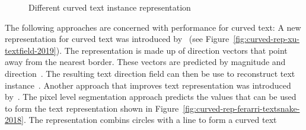 \begin{figure}[ht]
    \centering\scriptsize
    \caption{%
        Different curved text instance representation\label{fig:curved-text-representations}
    }
\end{figure}
The following approaches are concerned with performance for curved text:
A new representation for curved text was introduced
by~\cite{xu_textfield_2019} (see Figure~\ref{fig:curved-rep-xu-textfield-2019}).
The representation is made up of direction vectors that point away from the nearest border.
These vectors are predicted by magnitude and direction~\citep{xu_textfield_2019}.
The resulting text direction field can then be use to reconstruct text
instance~\citep{xu_textfield_2019}.
Another approach that improves text representation was introduced by~\cite{ferrari_textsnake_2018}.
The pixel level segmentation approach predicts the values that can be used to form the text
representation shown in Figure~\ref{fig:curved-rep-ferarri-textsnake-2018}.
The representation combins circles with a line to form a curved text
